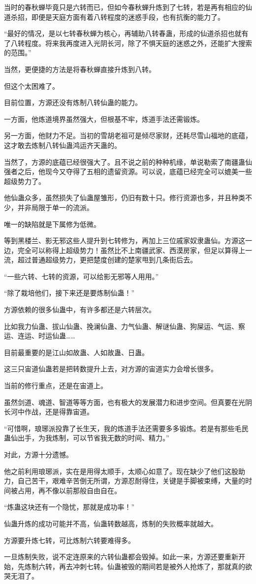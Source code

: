 \begin{this_body}
当时的春秋蝉毕竟只是六转而已，但如今春秋蝉升炼到了七转，若是再有相应的仙道杀招，即便是天庭方面有着八转程度的迷惑手段，也有抗衡的能力了。

“最好的情况，是以七转春秋蝉为核心，再辅助八转春蛊，形成的仙道杀招也就有了八转程度。将来我再度进入光阴长河，除了不惧天庭的迷惑之外，还能扩大搜索的范围。”

当然，更便捷的方法是将春秋蝉直接升炼到八转。

但这个太困难了。

目前位置，方源还没有炼制八转仙蛊的能力。

一方面，他炼道境界虽然强大，但根基不牢，炼道手法还需锻炼。

另一方面，他财力不足。当初的雪胡老祖可是倾尽家财，还耗尽雪山福地的底蕴，这才敢去炼制八转仙蛊鸿运齐天蛊的。

当然了，方源的底蕴已经很强大了。且不说之前的种种机缘，单说勒索了南疆蛊仙强者之后，他现今又夺得了五相的遗留资源。可以说，底蕴已经完全可以媲美一些超级势力了。

他仙蛊众多，虽然损失了仙蛊屋雏形，仍旧有数十只。修行资源也多，并且种类不少，并非局限于单一的流派。

唯一的缺陷就是下属修为低微。

等到黑楼兰、影无邪这些人提升到七转修为，再加上三位戚家奴隶蛊仙。方源这一边，完全可以称得上超级势力！虽然比不上南疆武家、西漠房家，但足以算得上一流，超过普通超级势力，更把楚度创建的楚家甩到几条街后去。

“一些六转、七转的资源，可以给影无邪等人用用。”

“除了栽培他们，接下来还是要炼制仙蛊！”

方源依赖的很多仙蛊中，有许多都还是六转层次。

比如我力仙蛊、拔山仙蛊、挽澜仙蛊、力气仙蛊、解谜仙蛊、狗屎运、气运、察运、连运、时运仙蛊……

目前最重要的是江山如故蛊、人如故蛊、日蛊。

这三只宙道仙蛊若是把转数提升上去，对方源的宙道实力会增长很多。

当前的修行重点，还是在宙道上。

虽然剑道、魂道、智道等等方面，也有极大的发展潜力和进步空间。但真要在光阴长河中作战，还是得靠宙道。

“可惜啊，琅琊派投靠了长生天，我的炼道手法还需要多多锻炼。若是有那些毛民蛊仙出手，为我炼制，可以节省我无数的时间、精力。”

对此，方源十分遗憾。

他之前利用琅琊派，实在是用得太顺手，太顺心如意了。现在缺少了他们这股助力，自己苦干，艰难辛苦倒无所谓，方源忍耐得住，关键是手脚被束缚，大量的时间被占用，再不像以前那般自由自在。

“炼蛊这块还有一个隐忧，那就是成功率！”

仙蛊升炼的成功可能并不高，仙蛊转数越高，炼制的失败概率就越大。

方源要升炼七转，可比炼制六转要难得多。

一旦炼制失败，说不定连原来的六转仙蛊都会毁掉。如此一来，方源还要重新开始，先炼制六转，再去冲刺七转。仙蛊被毁的期间若是被外人抢炼了，那就真的欲哭无泪了。

\end{this_body}

